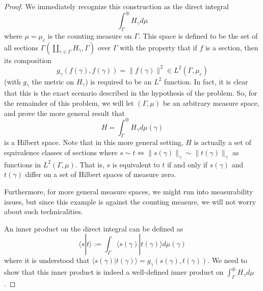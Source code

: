 \documentclass[fontsize=11pt]{scrartcl} %
\numberwithin{equation}{section} %
\numberwithin{figure}{section} %
\numberwithin{table}{section} %
\newcommand{\la}{\langle}
\newcommand{\ra}{\rangle}
\begin{document}
\begin{proof}
    We immediately recognize this construction as the direct integral
    \[
        \int_{\Gamma}^{\oplus}H_{\gamma}d\mu
    \]
    where $\mu=\mu_c$ is the counting measure on $\Gamma$. This space is defined
    to be the set of all sections
    $\Gamma(\coprod_{\gamma\in\Gamma}H_{\gamma},\Gamma)$ over $\Gamma$ with the
    property that if $f$ is a section, then its composition
    \[
        g_{\gamma}(f(\gamma),f(\gamma)) = \|f(\gamma)\|^2\in L^2(\Gamma,\mu_c)
    \]
    (with $g_{\gamma}$ the metric on $H_{\gamma}$)
    is required to be an $L^2$ function. In fact, it is clear that this is the
    exact scenario described in the hypothesis of the problem.
    So, for the remainder of this problem, we will let $(\Gamma,\mu)$ be an
    arbitrary measure space, and prove the more general result that
    \[
        H = \int_{\Gamma}^{\oplus}H_{\gamma}d\mu(\gamma)
    \]
    is a Hilbert space. Note that in this more general setting, $H$ is actually
    a set of equivalence classes of sections where $s\sim t \iff
    \|s(\gamma)\|_{\gamma} \sim \|t(\gamma)\|_{\gamma}$ as functions in
    $L^2(\Gamma,\mu)$.
    That is, $s$ is equivalent to $t$ if and only if $s(\gamma)$ and
    $t(\gamma)$ differ on a set of Hilbert spaces of measure zero.
    
    Furthermore, for more general measure spaces, we might run into
    measurability issues, but since this example is against the counting
    measure, we will not worry about such technicalities.

    An inner product on the direct integral can be defined as
    \[
        \la s|t\ra := \int_{\Gamma}\la s(\gamma)|t(\gamma)\ra d\mu(\gamma)
    \]
    where it is understood that $\la s(\gamma)|t(\gamma)\ra =
    g_{\gamma}(s(\gamma),t(\gamma))$.
    We need to show that this inner product is indeed a well-defined inner
    product on $\int_{\Gamma}^{\oplus}H_{\gamma}d\mu$.



\end{proof}
\end{document}
